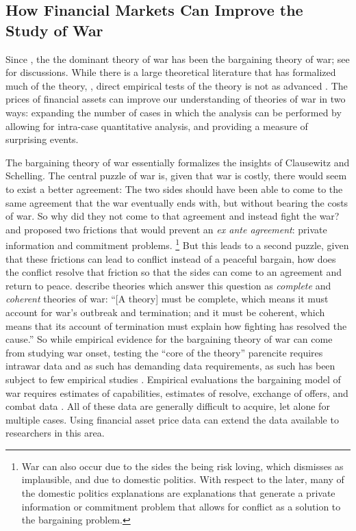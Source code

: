 \subsection{How Financial Markets Can Improve the Study of War}
\label{sec:how-prices-financial-1}

Since \parencite{Fearon1995}, the the dominant theory of war has been the bargaining theory of war; see \textcites{Reiter2003}{Powell2006}{Reiter2009} for discussions.%
While there is a large theoretical literature that has formalized much of the theory, \parencites{FilsonWerner2002}{Slantchev2003}{SmithStam2004}{Powell2004}{LeventogluSlantchev2007}{LangloisLanglois2009}{WolfordReiterCarrubba2011}, direct empirical tests of the theory is not as advanced \parencite{Reiter2009}.
The prices of financial assets can improve our understanding of theories of war in two ways: expanding the number of cases in which the analysis can be performed by allowing for intra-case quantitative analysis, and providing a measure of surprising events.

The bargaining theory of war essentially formalizes the insights of Clausewitz and Schelling.
The central puzzle of war is, given that war is costly, there would seem to exist a better agreement:
The two sides should have been able to come to the same agreement that the war eventually ends with, but without bearing the costs of war.
So why did they not come to that agreement and instead fight the war?
\parencite{Fearon1995} and \parencite{Powell2006} proposed two frictions that would prevent an \textit{ex ante agreement}: private information and commitment problems.%
\footnote{
  War can also occur due to the sides the being risk loving, which \textcite{Fearon1995} dismisses as implausible, and due to domestic politics.
  With respect to the later, many of the domestic politics explanations are explanations that generate a private information or commitment problem that allows for conflict as a solution to the bargaining problem.
}
But this leads to a second puzzle, given that these frictions can lead to conflict instead of a peaceful bargain, how does the conflict resolve that friction so that the sides can come to an agreement and return to peace.
\textcite[757]{LeventogluSlantchev2007} describe theories which answer this question as \textit{complete} and \textit{coherent} theories of war: ``[A theory] must be complete, which means it must account for war’s outbreak and termination; and it must be coherent, which means that its account of termination must explain how fighting has resolved the cause.''
So while empirical evidence for the bargaining theory of war can come from studying war onset, testing the ``core of the theory'' parencite requires intrawar data and as such has demanding data requirements, as such has been subject to few empirical studies \parencites{Reiter2003}{Ramsay2008}{Reiter2009}{Weisiger2015}.
Empirical evaluations the bargaining model of war requires estimates of capabilities, estimates of resolve, exchange of offers, and combat data \parencite{Reiter2003}.
All of these data are generally difficult to acquire, let alone for multiple cases.
Using financial asset price data can extend the data available to researchers in this area.

